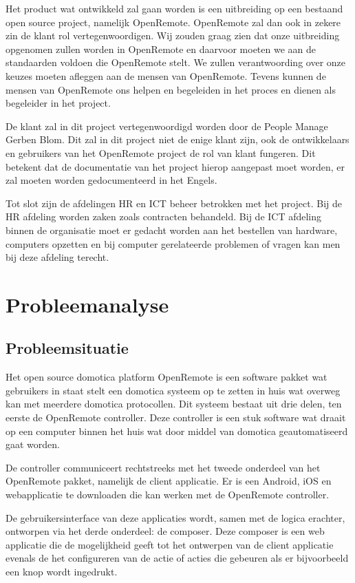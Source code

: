 \documentclass{article}
\begin{document}
Het product wat ontwikkeld zal gaan worden is een uitbreiding op een
bestaand open source project, namelijk OpenRemote. OpenRemote zal dan ook
in zekere zin de klant rol vertegenwoordigen. Wij zouden graag zien dat
onze uitbreiding opgenomen zullen worden in OpenRemote en daarvoor moeten
we aan de standaarden voldoen die OpenRemote stelt. We zullen
verantwoording over onze keuzes moeten afleggen aan de mensen van
OpenRemote. Tevens kunnen de mensen van OpenRemote ons helpen en begeleiden
in het proces en dienen als begeleider in het project.

De klant zal in dit project vertegenwoordigd worden door de People Manage
Gerben Blom. Dit zal in dit project niet de enige klant zijn, ook de
ontwikkelaars en gebruikers van het OpenRemote project de rol van klant
fungeren. Dit betekent dat de documentatie van het project hierop aangepast
moet worden, er zal moeten worden gedocumenteerd in het Engels.

Tot slot zijn de afdelingen HR en ICT beheer betrokken met het project. Bij
de HR afdeling worden zaken zoals contracten behandeld. Bij de ICT afdeling
binnen de organisatie moet er gedacht worden aan het bestellen van
hardware, computers opzetten en bij computer gerelateerde problemen of
vragen kan men bij deze afdeling terecht.

\newpage
\section{Probleemanalyse}

\subsection{Probleemsituatie}

Het open source domotica platform OpenRemote is een software pakket wat
gebruikers in staat stelt een domotica systeem op te zetten in huis wat
overweg kan met meerdere domotica protocollen. Dit systeem bestaat uit drie
delen, ten eerste de OpenRemote controller. Deze controller is een stuk
software wat draait op een computer binnen het huis wat door middel van
domotica geautomatiseerd gaat worden.

De controller communiceert rechtstreeks met het tweede onderdeel van het
OpenRemote pakket, namelijk de client applicatie. Er is een Android, iOS en
webapplicatie te downloaden die kan werken met de OpenRemote controller.

De gebruikersinterface van deze applicaties wordt, samen met de logica
erachter, ontworpen via het derde onderdeel: de composer. Deze composer is
een web applicatie die de mogelijkheid geeft tot het ontwerpen van de
client applicatie evenals de het configureren van de actie of acties die
gebeuren als er bijvoorbeeld een knop wordt ingedrukt.
\end{document}
